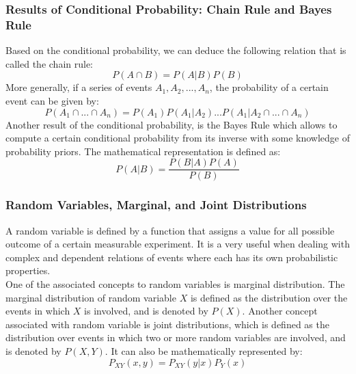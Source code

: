 \documentclass{article}
\begin{document}
\subsubsection{Results of Conditional Probability: Chain Rule and Bayes Rule}
Based on the conditional probability, we can deduce the following relation that is called the chain rule:
\begin{equation}
P(A \cap B) = P(A|B) P(B)
\end{equation}
More generally, if a series of events $A_1, A_2, ..., A_n$, the probability of a certain event can be given by:
\begin{equation}
P(A_1 \cap ... \cap A_n) = P(A_1)P(A_1|A_2) ... P(A_1|A_2 \cap ... \cap A_n)
\end{equation}
Another result of the conditional probability, is the Bayes Rule which allows to compute a certain conditional probability from its inverse with some knowledge of probability priors. The mathematical representation is defined as:
\begin{equation}
P(A|B) = \frac{P(B|A)P(A)}{P(B)}
\end{equation}

\subsubsection{Random Variables, Marginal, and Joint Distributions}
A random variable is defined by a function that assigns a value for all possible outcome of a certain measurable experiment. It is a very useful when dealing with complex and dependent relations of events where each has its own probabilistic properties. \\ 

One of the associated concepts to random variables is marginal distribution. The marginal distribution of random variable $X$ is defined as the distribution over the events in which $X$ is involved, and is denoted by $P(X)$. Another concept associated with random variable is joint distributions, which is defined as the distribution over events in which two or more random variables are involved, and is denoted by $P(X,Y)$. It can also be mathematically represented by:
\begin{equation}
P_{XY}(x,y) = P_{XY}(y|x)P_Y(x)
\end{equation}
\end{document}
